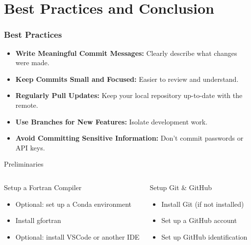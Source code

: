 \section{Best Practices and Conclusion}

\begin{frame}
	\frametitle{Best Practices}
	\begin{itemize}
		\item \textbf{Write Meaningful Commit Messages:} Clearly describe what changes were made.
		\item \textbf{Keep Commits Small and Focused:} Easier to review and understand.
		\item \textbf{Regularly Pull Updates:} Keep your local repository up-to-date with the remote.
		\item \textbf{Use Branches for New Features:} Isolate development work.
		\item \textbf{Avoid Committing Sensitive Information:} Don't commit passwords or API keys.
	\end{itemize}
\end{frame}

\begin{frame}{Preliminaries}
	\begin{columns}[T]
		\begin{block}{Setup a Fortran Compiler}
			\begin{itemize}
				\item Optional: set up a Conda environment
				\item Install gfortran
				\item Optional: install VSCode or another IDE
			\end{itemize}
		\end{block}		
		\begin{block}{Setup Git \& GitHub}
			\begin{itemize}
				\item Install Git (if not installed)
				\item Set up a GitHub account
				\item Set up GitHub identification
			\end{itemize}
		\end{block}		
	\end{columns}
\end{frame}



